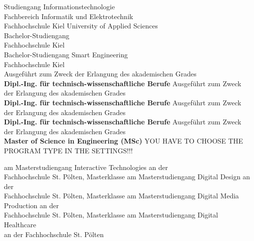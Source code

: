 \begin{center}
\vspace{1.3cm}
\ifuseBachelorMediaTechnologiesOne
	\fontsize{11pt}{15pt}\selectfont Studiengang Informationstechnologie\\
	Fachbereich Informatik und Elektrotechnik\\
Fachhochschule Kiel University of Applied Sciences\\  
\else
	\ifuseBachelorMediaTechnologiesTwo
		\fontsize{11pt}{15pt}\selectfont Bachelor-Studiengang \\
Fachhochschule Kiel\\  
\else
	\ifuseBachelorSmartEngineeringOne
    	\fontsize{11pt}{15pt}\selectfont Bachelor-Studiengang Smart Engineering\\
Fachhochschule Kiel\\ 
\else
	\ifuseMasterInteractiveTechnologies
		\fontsize{11pt}{15pt}\selectfont Ausgeführt zum Zweck der Erlangung des akademischen Grades\\
		\textbf{Dipl.-Ing. für technisch-wissenschaftliche Berufe}
\else
	\ifuseMasterDigitalDesign
		\fontsize{11pt}{15pt}\selectfont Ausgeführt zum Zweck der Erlangung des akademischen Grades\\
		\textbf{Dipl.-Ing. für technisch-wissenschaftliche Berufe}	
\else
    \ifuseMasterDigitalMediaProduction
		\fontsize{11pt}{15pt}\selectfont Ausgeführt zum Zweck der Erlangung des akademischen Grades\\
		\textbf{Dipl.-Ing. für technisch-wissenschaftliche Berufe}	
\else
	\ifuseMasterDigitalHealthCare
    	\fontsize{11pt}{15pt}\selectfont Ausgeführt zum Zweck der Erlangung des akademischen Grades\\
		\textbf{Master of Science in Engineering (MSc)}
    \else
        \LARGE{YOU HAVE TO CHOOSE THE PROGRAM TYPE IN THE SETTINGS!!!}
\fi\fi\fi\fi\fi\fi\fi

\vspace{4mm}

\ifuseMasterInteractiveTechnologies
	am Masterstudiengang Interactive Technologies an der\\ 
Fachhochschule St. Pölten, Masterklasse \specialization
\else
    \ifuseMasterDigitalDesign
	am Masterstudiengang Digital Design an der\\ 
Fachhochschule St. Pölten, Masterklasse \specialization
\else
    \ifuseMasterDigitalMediaProduction
	am Masterstudiengang Digital Media Production an der\\ 
Fachhochschule St. Pölten, Masterklasse \specialization
\else
	\ifuseMasterDigitalHealthCare
		am Masterstudiengang Digital Healthcare\\ 
an der Fachhochschule St. Pölten
    \else
        

\end{center}
